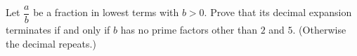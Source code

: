 Let $\dfrac ab$ be a fraction in lowest terms with $b>0$. Prove that its decimal expansion terminates if and only if $b$ has no prime factors other than $2$ and $5$. (Otherwise the decimal repeats.)
